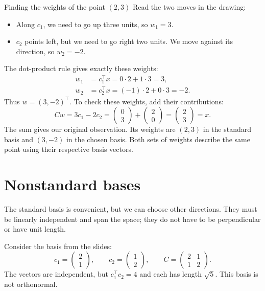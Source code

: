 \documentclass[a4paper,12pt,oneside]{report}
\begin{document}
\begin{framedexample}{Finding the weights of the point $(2,3)$}
Read the two moves in the drawing:
\begin{itemize}
  \item Along $c_1$, we need to go up three units, so $w_1=3$.
  \item $c_2$ points left, but we need to go right two units. We move
        against its direction, so $w_2=-2$.
\end{itemize}
The dot-product rule gives exactly these weights:
\[
\begin{aligned}
  w_1&=c_1^\top x=0\cdot2+1\cdot3=3,\\
  w_2&=c_2^\top x=(-1)\cdot2+0\cdot3=-2.
\end{aligned}
\]
Thus $w=(3,-2)^\top$. To check these weights, add their contributions:
\[
  Cw=3c_1-2c_2
    =\begin{pmatrix}0\\3\end{pmatrix}
     +\begin{pmatrix}2\\0\end{pmatrix}
    =\begin{pmatrix}2\\3\end{pmatrix}=x.
\]
The sum gives our original observation. Its weights are $(2,3)$ in
the standard basis and $(3,-2)$ in the chosen basis. Both sets of
weights describe the same point using their respective basis vectors.
\end{framedexample}

\clearpage
\section{Nonstandard bases}

The standard basis is convenient, but we can choose other directions.
They must be linearly independent and span the space; they do not have
to be perpendicular or have unit length.

Consider the basis from the slides:
\[
  c_1=\begin{pmatrix}2\\1\end{pmatrix},\qquad
  c_2=\begin{pmatrix}1\\2\end{pmatrix},\qquad
  C=\begin{pmatrix}2&1\\1&2\end{pmatrix}.
\]
The vectors are independent, but $c_1^\top c_2=4$ and each has length
$\sqrt{5}$. This basis is not orthonormal.
\end{document}
